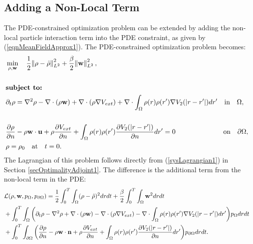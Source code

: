 \subsection{Adding a Non-Local Term}\label{secOptimalitySysNonLocal1}	
The PDE-constrained optimization problem can be extended by adding the non-local particle interaction term into the PDE constraint, as given by (\ref{eqnMeanFieldApprox1}).
The PDE-constrained optimization problem becomes:
\begin{align}\label{sysPDEconstroptiAndNonlocal1}
&\min_{\rho,\mathbf{w}} \quad \frac{1}{2}\norm{\rho- \hat{\rho}}_{L^2}^2 + \frac{\beta}{2} \norm{\mathbf{w}}_{L^2}^2,\\
\notag\\
&\textbf{subject to:}\notag\\ 
&\partial_t \rho = \nabla^2 \rho - \nabla \cdot (\rho \mathbf{w}) + \nabla \cdot (\rho \nabla V_{ext}) + \nabla \cdot \int_\Omega \rho(r) \rho(r') \nabla V_2(|r-r'|) dr' \quad \text{in} \quad \Omega,\notag\\
\notag\\
&\dfrac{\partial \rho}{\partial n} - \rho \mathbf{w} \cdot \mathbf{u} + \rho \dfrac{\partial V_{ext}}{\partial n} +\int_\Omega \rho(r) \rho(r') \frac{\partial V_2(|r-r'|)}{\partial n} dr'  =0 \quad\quad \quad \quad \quad \quad \quad \text{on} \quad \partial \Omega,\notag \\
& \rho = \rho_0 \quad \text{at} \quad t=0.  \notag
\end{align}
The Lagrangian of this problem follows directly from (\ref{sysLagrangian1}) in Section \ref{secOptimalityAdjoint1}. The difference is the additional term from the non-local term in the PDE:
\begin{align}\label{sysLagrangianNonLocal1} 
&\mathcal{L}(\rho,\mathbf{w}, p_\Omega, p_{\partial \Omega}) = \frac{1}{2}\int_0^T\int_\Omega  (\rho- \hat{\rho})^2 dr dt  + \frac{\beta}{2} \int_0^T \int_\Omega \mathbf{w}^2 dr dt \\
&+ \int_0^T \int_\Omega \bigg( \partial_t \rho - \nabla^2 \rho + \nabla \cdot (\rho \mathbf{w}) - \nabla \cdot (\rho \nabla V_{ext}) \notag - \nabla \cdot \int_\Omega \rho(r) \rho(r') \nabla V_2(|r-r'|) dr'\bigg) p_\Omega dr dt \notag \\ 
&+\int_0^T  \int_{\partial \Omega}  \bigg(\dfrac{\partial \rho}{\partial n} - \rho \mathbf{w} \cdot \mathbf{n} + \rho \dfrac{\partial V_{ext}}{\partial n}+\int_\Omega \rho(r) \rho(r') \frac{\partial V_2(|r-r'|)}{\partial n} dr'\bigg) p_{\partial \Omega} dr dt  \notag.
\end{align}
